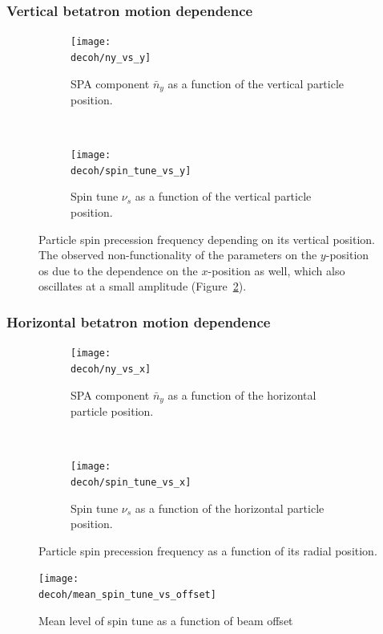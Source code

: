 \documentclass{beamer}
\newcommand{\home}{\string~}
\newcommand{\Artem}{\home/REPOS/COSYINF/img/Artem}
\newcommand{\decoh}{\Artem/decoherence_frequency_dependence}
\begin{document}
\begin{frame}\frametitle{Vertical betatron motion dependence}
  \begin{figure}[H]
    \centering
    \begin{subfigure}[t]{.5\textwidth}
      \texttt{[image: \\decoh/ny\_vs\_y]}
      \caption{SPA component $\bar n_y$ as a function of the vertical particle position.}
    \end{subfigure}~
    \begin{subfigure}[t]{.5\textwidth}
      \texttt{[image: \\decoh/spin\_tune\_vs\_y]}
      \caption{Spin tune $\nu_s$ as a function of the vertical particle position.}
    \end{subfigure}
    \caption{Particle spin precession frequency depending on its vertical position.
      The observed non-functionality of the parameters on the $y$-position os due to the dependence on the $x$-position as well, which also oscillates at a small amplitude (Figure~\ref{fig:tune_axis_position_x}). \label{fig:tune_axis_position_y}}
  \end{figure}
\end{frame}

\begin{frame}\frametitle{Horizontal betatron motion dependence}
  \begin{figure}[H]
    \centering
    \begin{subfigure}[t]{.5\textwidth}
      \texttt{[image: \\decoh/ny\_vs\_x]}
      \caption{SPA component $\bar n_y$ as a function of the horizontal particle position.}
    \end{subfigure}~
    \begin{subfigure}[t]{.5\textwidth}
      \texttt{[image: \\decoh/spin\_tune\_vs\_x]}
      \caption{Spin tune $\nu_s$ as a function of the horizontal particle position.}
    \end{subfigure}
    \caption{Particle spin precession frequency as a function of its radial position.\label{fig:tune_axis_position_x}}
  \end{figure}
\end{frame}

\begin{frame}
  \begin{figure}[H]
    \centering
    \texttt{[image: \\decoh/mean\_spin\_tune\_vs\_offset]}
    \caption{Mean level of spin tune as a function of beam offset}
  \end{figure}
\end{frame}
\end{document}
